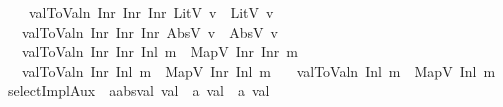 \begin{isabellebody}
\ \ \ \ {\isachardoublequoteopen}val{}ToValn\ {\isacharparenleft}{\kern0pt}Inr\ {\isacharparenleft}{\kern0pt}Inr\ {\isacharparenleft}{\kern0pt}Inr\ {\isacharparenleft}{\kern0pt}LitV{}\ v{\isacharparenright}{\kern0pt}{\isacharparenright}{\kern0pt}{\isacharparenright}{\kern0pt}{\isacharparenright}{\kern0pt}\ {\isacharequal}{\kern0pt}\ {\isacharparenleft}{\kern0pt}LitV\ v{\isacharparenright}{\kern0pt}{\isachardoublequoteclose}\isanewline
\ \ {\isacharbar}{\kern0pt}\ {\isachardoublequoteopen}val{}ToValn\ {\isacharparenleft}{\kern0pt}Inr\ {\isacharparenleft}{\kern0pt}Inr\ {\isacharparenleft}{\kern0pt}Inr\ {\isacharparenleft}{\kern0pt}AbsV{}\ v{\isacharparenright}{\kern0pt}{\isacharparenright}{\kern0pt}{\isacharparenright}{\kern0pt}{\isacharparenright}{\kern0pt}\ {\isacharequal}{\kern0pt}\ {\isacharparenleft}{\kern0pt}AbsV\ v{\isacharparenright}{\kern0pt}{\isachardoublequoteclose}\isanewline
\ \ {\isacharbar}{\kern0pt}\ {\isachardoublequoteopen}val{}ToValn\ {\isacharparenleft}{\kern0pt}Inr\ {\isacharparenleft}{\kern0pt}Inr\ {\isacharparenleft}{\kern0pt}Inl\ m{\isacharparenright}{\kern0pt}{\isacharparenright}{\kern0pt}{\isacharparenright}{\kern0pt}\ {\isacharequal}{\kern0pt}\ {\isacharparenleft}{\kern0pt}MapV\ {\isacharparenleft}{\kern0pt}Inr\ {\isacharparenleft}{\kern0pt}Inr\ m{\isacharparenright}{\kern0pt}{\isacharparenright}{\kern0pt}{\isacharparenright}{\kern0pt}{\isachardoublequoteclose}\isanewline
\ \ {\isacharbar}{\kern0pt}\ {\isachardoublequoteopen}val{}ToValn\ {\isacharparenleft}{\kern0pt}Inr\ {\isacharparenleft}{\kern0pt}Inl\ m{\isacharparenright}{\kern0pt}{\isacharparenright}{\kern0pt}\ {\isacharequal}{\kern0pt}\ {\isacharparenleft}{\kern0pt}MapV\ {\isacharparenleft}{\kern0pt}Inr\ {\isacharparenleft}{\kern0pt}Inl\ m{\isacharparenright}{\kern0pt}{\isacharparenright}{\kern0pt}{\isacharparenright}{\kern0pt}{\isachardoublequoteclose}\isanewline
\ \ {\isacharbar}{\kern0pt}\ {\isachardoublequoteopen}val{}ToValn\ {\isacharparenleft}{\kern0pt}Inl\ m{\isacharparenright}{\kern0pt}\ {\isacharequal}{\kern0pt}\ {\isacharparenleft}{\kern0pt}MapV\ {\isacharparenleft}{\kern0pt}Inl\ m{\isacharparenright}{\kern0pt}{\isacharparenright}{\kern0pt}{\isachardoublequoteclose}\isanewline
\isanewline
{}\isamarkupfalse%
\ selectImplAux\ {\isacharcolon}{\kern0pt}{\isacharcolon}{\kern0pt}\ {\isachardoublequoteopen}{\isacharprime}{\kern0pt}a{\isacharcolon}{\kern0pt}{\isacharcolon}{\kern0pt}absval\ val{}{}{}{}\ {\isasymRightarrow}\ {\isacharprime}{\kern0pt}a\ val{}{}{}{}\ {\isasymRightarrow}\ {\isacharprime}{\kern0pt}a\ val{}{}{}{}{\isachardoublequoteclose}\ \isanewline

\end{isabellebody}
